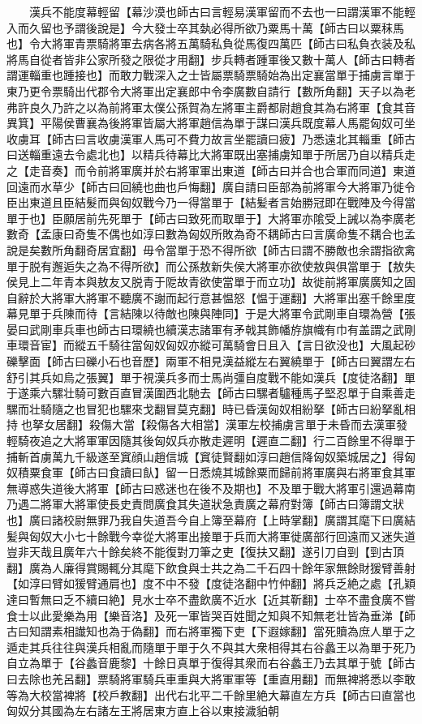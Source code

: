 　　漢兵不能度幕輕留【幕沙漠也師古曰言輕易漢軍留而不去也一曰謂漢軍不能輕入而久留也予謂後說是】今大發士卒其埶必得所欲乃粟馬十萬【師古曰以粟秣馬也】令大將軍青票騎將軍去病各將五萬騎私負從馬復四萬匹【師古曰私負衣装及私將馬自從者皆非公家所發之限從才用翻】步兵轉者踵軍後又數十萬人【師古曰轉者謂運輜重也踵接也】而敢力戰深入之士皆屬票騎票騎始為出定襄當單于捕虜言單于東乃更令票騎出代郡令大將軍出定襄郎中令李廣數自請行【數所角翻】天子以為老弗許良久乃許之以為前將軍太僕公孫賀為左將軍主爵都尉趙食其為右將軍【食其音異箕】平陽侯曹襄為後將軍皆屬大將軍趙信為單于謀曰漢兵既度幕人馬罷匈奴可坐收虜耳【師古曰言收虜漢軍人馬可不費力故言坐罷讀曰疲】乃悉遠北其輜重【師古曰送輜重遠去令處北也】以精兵待幕比大將軍既出塞捕虜知單于所居乃自以精兵走之【走音奏】而令前將軍廣并於右將軍軍出東道【師古曰并合也合軍而同道】東道回遠而水草少【師古曰回繞也曲也戶悔翻】廣自請曰臣部為前將軍今大將軍乃徙令臣出東道且臣結髮而與匈奴戰今乃一得當單于【結髪者言始勝冠即在戰陣及今得當單于也】臣願居前先死單于【師古曰致死而取單于】大將軍亦隂受上誡以為李廣老數奇【孟康曰奇隻不偶也如淳曰數為匈奴所敗為奇不耦師古曰言廣命隻不耦合也孟說是矣數所角翻奇居宜翻】毋令當單于恐不得所欲【師古曰謂不勝敵也余謂指欲禽單于脱有邂逅失之為不得所欲】而公孫敖新失侯大將軍亦欲使敖與俱當單于【敖失侯見上二年青本與敖友又脱青于阸故青欲使當單于而立功】故徙前將軍廣廣知之固自辭於大將軍大將軍不聽廣不謝而起行意甚愠怒【愠于運翻】大將軍出塞千餘里度幕見單于兵陳而待【言結陳以待敵也陳與陣同】于是大將軍令武剛車自環為營【張晏曰武剛車兵車也師古曰環繞也續漢志諸軍有矛戟其飾幡斿旗幟有巾有盖謂之武剛車環音宦】而縱五千騎往當匈奴匈奴亦縱可萬騎會日且入【言日欲没也】大風起砂礫擊面【師古曰礫小石也音歷】兩軍不相見漢益縱左右翼繞單于【師古曰翼謂左右舒引其兵如烏之張翼】單于視漢兵多而士馬尚彊自度戰不能如漢兵【度徒洛翻】單于遂乘六騾壮騎可數百直冒漢圍西北馳去【師古曰騾者驢種馬子堅忍單于自乘善走騾而壮騎隨之也冒犯也騾來戈翻冒莫克翻】時已昏漢匈奴相紛拏【師古曰紛拏亂相持也拏女居翻】殺傷大當【殺傷各大相當】漢軍左校捕虜言單于未昏而去漢軍發輕騎夜追之大將軍軍因隨其後匈奴兵亦散走遲明【遲直二翻】行二百餘里不得單于捕斬首虜萬九千級遂至窴顔山趙信城【窴徒賢翻如淳曰趙信降匈奴築城居之】得匈奴積粟食軍【師古曰食讀曰飤】留一日悉燒其城餘粟而歸前將軍廣與右將軍食其軍無導惑失道後大將軍【師古曰惑迷也在後不及期也】不及單于戰大將軍引還過幕南乃遇二將軍大將軍使長史責問廣食其失道狀急責廣之幕府對簿【師古曰簿謂文狀也】廣曰諸校尉無罪乃我自失道吾今自上簿至幕府【上時掌翻】廣謂其麾下曰廣結髪與匈奴大小七十餘戰今幸從大將軍出接單于兵而大將軍徙廣部行回遠而又迷失道豈非天哉且廣年六十餘矣終不能復對刀筆之吏【復扶又翻】遂引刀自剄【剄古頂翻】廣為人廉得賞賜輒分其麾下飲食與士共之為二千石四十餘年家無餘財猨臂善射【如淳曰臂如猨臂通肩也】度不中不發【度徒洛翻中竹仲翻】將兵乏絶之處【孔穎達曰暫無曰乏不續曰絶】見水士卒不盡飲廣不近水【近其靳翻】士卒不盡食廣不嘗食士以此愛樂為用【樂音洛】及死一軍皆哭百姓聞之知與不知無老壮皆為垂涕【師古曰知謂素相䜟知也為于偽翻】而右將軍獨下吏【下遐嫁翻】當死贖為庶人單于之遁走其兵往往與漢兵相亂而隨單于單于久不與其大衆相得其右谷蠡王以為單于死乃自立為單于【谷蠡音鹿黎】十餘日真單于復得其衆而右谷蠡王乃去其單于號【師古曰去除也羌呂翻】票騎將軍騎兵車重與大將軍軍等【重直用翻】而無裨將悉以李敢等為大校當裨將【校戶教翻】出代右北平二千餘里絶大幕直左方兵【師古曰直當也匈奴分其國為左右諸左王將居東方直上谷以東接濊貃朝